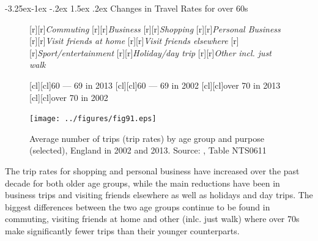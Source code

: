 \documentclass[11 pt, a4paper]{report}
\makeatletter
\renewcommand{\arraystretch}{1.2}
\renewcommand\subsection{\@startsection{subsection}{2}{\z@}%
                                     {-3.25ex\@plus -1ex \@minus -.2ex}%
                                     {1.5ex \@plus .2ex}%
    								{\large\scshape}}
\makeatother
\begin{document}
\clearpage


\subsection{Changes in Travel Rates for over 60s}
\begin{figure}[hbtp!]
[r][r]{\small{\emph{Commuting}}}
[r][r]{\small{\emph{Business}}}
[r][r]{\small{\emph{Shopping}}}
[r][r]{\small{\emph{Personal Business}}}
[r][r]{\small{\emph{Visit friends at home}}}
[r][r]{\small{\emph{Visit friends elsewhere}}}
[r][r]{\small{\emph{Sport/entertainment}}}
[r][r]{\small{\emph{Holiday/day trip}}}
[r][r]{\small{\emph{Other incl. just walk}}}


[cl][cl]{\small{60 --- 69 in 2013}}
[cl][cl]{\small{60 --- 69 in 2002}}
[cl][cl]{\small{over 70 in 2013}}
[cl][cl]{\small{over 70 in 2002}}

\texttt{[image: ../figures/fig91.eps]}
\caption{Average number of trips (trip rates) by age group and purpose (selected),  England in 2002 and 2013. Source: \cite{DoT201}, Table NTS0611 }\label{Fig:91} %
\end{figure}
The trip rates for shopping and personal business have increased over the past decade for both older age groups, while the main reductions have been in business trips and visiting friends elsewhere as well as holidays and day trips. The biggest differences between the two age groups continue to be found in commuting, visiting friends at home and other (inlc. just walk) where over 70s make significantly fewer trips than their younger counterparts. 

\renewcommand{\arraystretch}{1}
\end{document}
